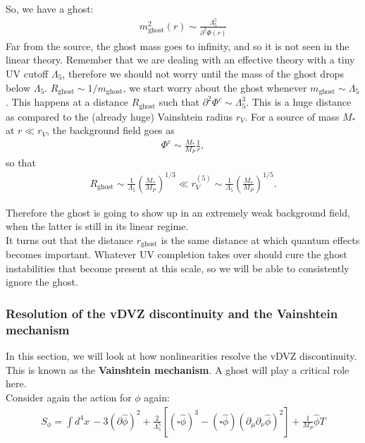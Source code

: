 \documentclass{book}
\theoremstyle{definition}
\newcommand{\p}{\partial}
\newcommand{\f}[2]{\frac{#1}{#2}}
\newcommand{\lp}{\left(}
\newcommand{\rp}{\right)}
\begin{document}
So, we have a ghost:
\begin{align}
\boxed{m^2_{\text{ghost}}(r) \sim \f{\Lambda_5^5}{\p^2 \Phi(r)}}
\end{align}
Far from the source, the ghost mass goes to infinity, and so it is not seen in the linear theory. Remember that we are dealing with an effective theory with a tiny UV cutoff $\Lambda_5$, therefore we should not worry until the mass of the ghost drops below $\Lambda_5$. $R_\text{ghost} \sim 1/m_\text{ghost}$, we start worry about the ghost whenever $m_\text{ghost}\sim \Lambda_5$. This happens at a distance $R_\text{ghost}$ such that $\p^2 \Phi^c \sim \Lambda_5^3$. This is a huge distance as compared to the (already huge) Vainshtein radius $r_V$. For a source of mass $M_*$ at $r\ll r_V$, the background field goes as 
\begin{align}
\Phi^c 	\sim \f{M_*}{M_P} \f{1}{r},
\end{align}
so that
\begin{align}
R_\text{ghost} \sim \f{1}{\Lambda_5}\lp \f{M_*}{M_P} \rp^{1/3} \ll r_V^{(5)} \sim \f{1}{\Lambda_5}\lp \f{M_*}{M_P} \rp^{1/5}.
\end{align}

Therefore the ghost is going to show up in an extremely weak background field, when the latter is still in its linear regime.\\

It turns out that the distance $r_\text{ghost}$ is the same distance at which quantum effects becomes important. Whatever UV completion takes over should cure the ghost instabilities that become present at this scale, so we will be able to consistently ignore the ghost. 












\newpage
\subsubsection{Resolution of the vDVZ discontinuity and the Vainshtein mechanism}


In this section, we will look at how nonlinearities resolve the vDVZ discontinuity. This is known as the \textbf{Vainshtein mechanism}. A ghost will play a critical role here.\\

Consider again the action for $\phi$ again:
\begin{align}
S_\phi = \int d^4x\, -3(\p \hat{\phi})^2 + \f{2}{\Lambda_5^5}[(\square \hat\phi)^3 - (\square \hat\phi)(\p_\mu \p_\nu \hat\phi)^2] + \f{1}{M_P}\hat\phi T
\end{align}
\end{document}
